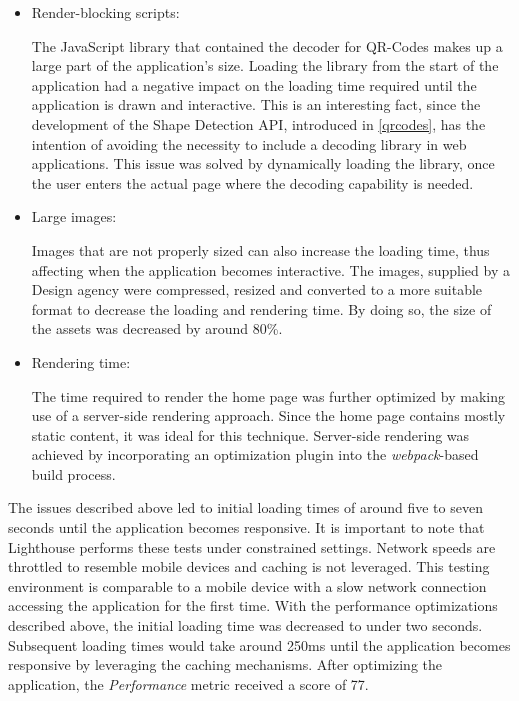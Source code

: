 \begin{itemize}
\item Render-blocking scripts:

The JavaScript library that contained the decoder for QR-Codes makes up a large part of the application's size. Loading the library from the start of the application had a negative impact on the loading time required until the application is drawn and interactive. This is an interesting fact, since the development of the Shape Detection API, introduced in \ref{qrcodes}, has the intention of avoiding the necessity to include a decoding library in web applications. This issue was solved by dynamically loading the library, once the user enters the actual page where the decoding capability is needed.
\item Large images:

Images that are not properly sized can also increase the loading time, thus affecting when the application becomes interactive. The images, supplied by a Design agency were compressed, resized and converted to a more suitable format to decrease the loading and rendering time. By doing so, the size of the assets was decreased by around 80\%.

\item Rendering time:

The time required to render the home page was further optimized by making use of a server-side rendering approach. Since the home page contains mostly static content, it was ideal for this technique. Server-side rendering was achieved by incorporating an optimization plugin into the \textit{webpack}-based build process.
\end{itemize}
The issues described above led to initial loading times of around five to seven seconds until the application becomes responsive. It is important to note that Lighthouse performs these tests under constrained settings. Network speeds are throttled to resemble mobile devices and caching is not leveraged. This testing environment is comparable to a mobile device with a slow network connection accessing the application for the first time. With the performance optimizations described above, the initial loading time was decreased to under two seconds. Subsequent loading times would take around 250ms until the application becomes responsive by leveraging the caching mechanisms.
After optimizing the application, the \textit{Performance} metric received a score of 77.

